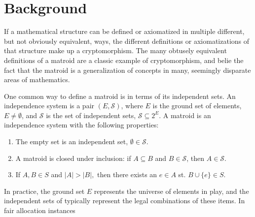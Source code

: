 \chapter{Background}
If a mathematical structure can be defined or axiomatized in multiple different, but not obviously equivalent, ways, the different definitions or axiomatizations of that structure make up a cryptomorphism. The many obtusely equivalent definitions of a matroid are a classic example of cryptomorphism, and belie the fact that the matroid is a generalization of concepts in many, seemingly disparate areas of mathematics.

One common way to define a matroid is in terms of its independent sets. An independence system is a pair $(E, \mathcal{S})$, where $E$ is the ground set of elements, $E \not= \emptyset$, and $\mathcal{S}$ is the set of independent sets, $\mathcal{S} \subseteq 2^E$. A matroid is an independence system with the following properties:

\begin{enumerate}
  \item The empty set is an independent set, $\emptyset \in \mathcal{S}$.
  \item A matroid is closed under inclusion: if $A \subseteq B$ and $B \in \mathcal{S}$, then $A \in \mathcal{S}$.
  \item If $A, B \in S$ and $|A| > |B|,$ then there exists an $e \in A$ st. $B \cup \{e\} \in S$.
\end{enumerate}

In practice, the ground set $E$ represents the universe of elements in play, and the independent sets of typically represent the legal combinations of these items. In fair allocation instances

